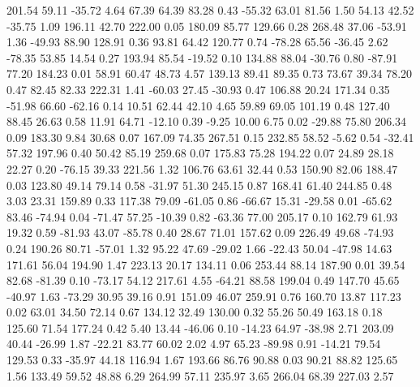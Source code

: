   201.54   59.11  -35.72    4.64
   67.39   64.39   83.28    0.43
  -55.32   63.01   81.56    1.50
   54.13   42.52  -35.75    1.09
  196.11   42.70  222.00    0.05
  180.09   85.77  129.66    0.28
  268.48   37.06  -53.91    1.36
  -49.93   88.90  128.91    0.36
   93.81   64.42  120.77    0.74
  -78.28   65.56  -36.45    2.62
  -78.35   53.85   14.54    0.27
  193.94   85.54  -19.52    0.10
  134.88   88.04  -30.76    0.80
  -87.91   77.20  184.23    0.01
   58.91   60.47   48.73    4.57
  139.13   89.41   89.35    0.73
   73.67   39.34   78.20    0.47
   82.45   82.33  222.31    1.41
  -60.03   27.45  -30.93    0.47
  106.88   20.24  171.34    0.35
  -51.98   66.60  -62.16    0.14
   10.51   62.44   42.10    4.65
   59.89   69.05  101.19    0.48
  127.40   88.45   26.63    0.58
   11.91   64.71  -12.10    0.39
   -9.25   10.00    6.75    0.02
  -29.88   75.80  206.34    0.09
  183.30    9.84   30.68    0.07
  167.09   74.35  267.51    0.15
  232.85   58.52   -5.62    0.54
  -32.41   57.32  197.96    0.40
   50.42   85.19  259.68    0.07
  175.83   75.28  194.22    0.07
   24.89   28.18   22.27    0.20
  -76.15   39.33  221.56    1.32
  106.76   63.61   32.44    0.53
  150.90   82.06  188.47    0.03
  123.80   49.14   79.14    0.58
  -31.97   51.30  245.15    0.87
  168.41   61.40  244.85    0.48
    3.03   23.31  159.89    0.33
  117.38   79.09  -61.05    0.86
  -66.67   15.31  -29.58    0.01
  -65.62   83.46  -74.94    0.04
  -71.47   57.25  -10.39    0.82
  -63.36   77.00  205.17    0.10
  162.79   61.93   19.32    0.59
  -81.93   43.07  -85.78    0.40
   28.67   71.01  157.62    0.09
  226.49   49.68  -74.93    0.24
  190.26   80.71  -57.01    1.32
   95.22   47.69  -29.02    1.66
  -22.43   50.04  -47.98   14.63
  171.61   56.04  194.90    1.47
  223.13   20.17  134.11    0.06
  253.44   88.14  187.90    0.01
   39.54   82.68  -81.39    0.10
  -73.17   54.12  217.61    4.55
  -64.21   88.58  199.04    0.49
  147.70   45.65  -40.97    1.63
  -73.29   30.95   39.16    0.91
  151.09   46.07  259.91    0.76
  160.70   13.87  117.23    0.02
   63.01   34.50   72.14    0.67
  134.12   32.49  130.00    0.32
   55.26   50.49  163.18    0.18
  125.60   71.54  177.24    0.42
    5.40   13.44  -46.06    0.10
  -14.23   64.97  -38.98    2.71
  203.09   40.44  -26.99    1.87
  -22.21   83.77   60.02    2.02
    4.97   65.23  -89.98    0.91
  -14.21   79.54  129.53    0.33
  -35.97   44.18  116.94    1.67
  193.66   86.76   90.88    0.03
   90.21   88.82  125.65    1.56
  133.49   59.52   48.88    6.29
  264.99   57.11  235.97    3.65
  266.04   68.39  227.03    2.57
